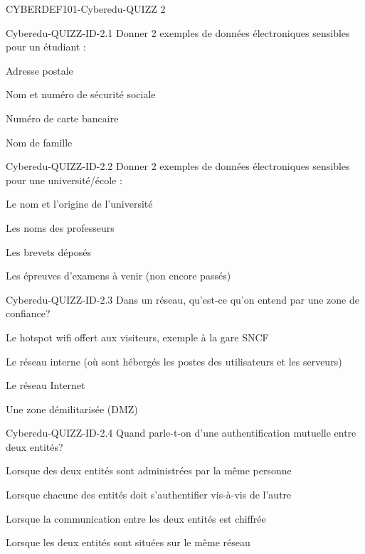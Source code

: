 \documentclass[12pt]{article}
\begin{document}
   \begin{quiz}{CYBERDEF101-Cyberedu-QUIZZ 2}


\begin{multi}[multiple=true]{Cyberedu-QUIZZ-ID-2.1}
	Donner 2 exemples de donn\'ees \'electroniques sensibles pour un \'etudiant :
\item Adresse postale
\item* Nom et num\'ero de s\'ecurit\'e sociale
\item* Num\'ero de carte bancaire
\item Nom de famille
\end{multi}

\begin{multi}[multiple=true]{Cyberedu-QUIZZ-ID-2.2}
	Donner 2 exemples de donn\'ees \'electroniques sensibles pour une universit\'e/\'ecole :
\item Le nom et l'origine de l'universit\'e
\item Les noms des professeurs
\item* Les brevets d\'epos\'es
\item* Les \'epreuves d'examens \`{a} venir (non encore pass\'es)
\end{multi}

\begin{multi}[multiple=true]{Cyberedu-QUIZZ-ID-2.3}
	Dans un r\'eseau, qu'est-ce qu'on entend par une zone de confiance?
\item Le hotspot wifi offert aux visiteurs, exemple \`{a} la gare SNCF
\item* Le r\'eseau interne (où sont h\'eberg\'es les postes des utilisateurs et les serveurs)
\item Le r\'eseau Internet
\item Une zone d\'emilitaris\'ee (DMZ)
\end{multi}

\begin{multi}[multiple=true]{Cyberedu-QUIZZ-ID-2.4}
	Quand parle-t-on d'une authentification mutuelle entre deux entit\'es?
\item Lorsque des deux entit\'es sont administr\'ees par la m\^eme personne
\item* Lorsque chacune des entit\'es doit s'authentifier vis-\`{a}-vis de l'autre
\item Lorsque la communication entre les deux entit\'es est chiffr\'ee
\item Lorsque les deux entit\'es sont situ\'ees sur le m\^eme r\'eseau
\end{multi}


\end{quiz}
\end{document}

